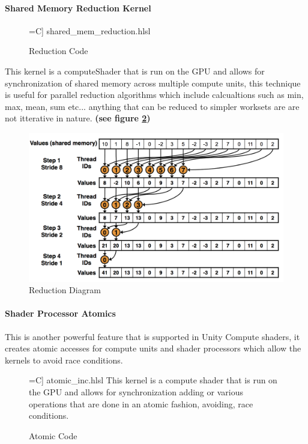 \documentclass[a4paper,10pt,twoside]{article}
\begin{document}
\paragraph{Shared Memory Reduction Kernel}
\begin{figure}[H]
	\label{fig:reductionCode}
 =C] {shared_mem_reduction.hlsl}
\caption{Reduction Code}
\end{figure}

This kernel is a computeShader that is run on the GPU and allows for synchronization of shared memory across multiple compute units, this technique is useful for parallel reduction algorithms which include
calcualtions such as min, max, mean, sum etc... anything that can be reduced to simpler worksets are are not itterative in nature. \textbf{(see figure \ref{fig:reductionImg})}

\begin{figure}[H]
	\includegraphics[width=\linewidth,height=\paperheight,keepaspectratio]{reduction.jpg}
	\caption{Reduction Diagram}
	\label{fig:reductionImg}
	\end{figure}
\paragraph{Shader Processor Atomics} 
This is another powerful feature that is supported in Unity Compute shaders, it creates atomic accesses for compute units and shader processors which allow the kernels to avoid race conditions. 
\begin{figure}[H]
 =C] {atomic_inc.hlsl}
This kernel is a compute shader that is run on the GPU and allows for synchronization adding or various operations that are done in an atomic fashion, avoiding, race conditions.
\caption{Atomic Code}
\label{fig:atomicCode}
\end{figure}
\end{document}
